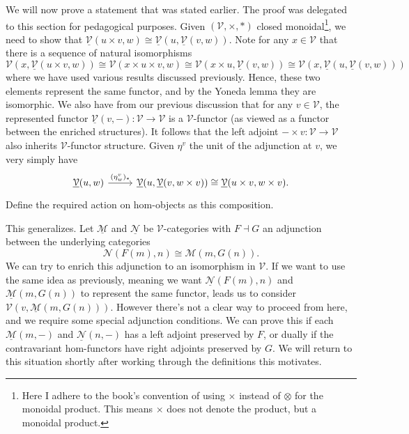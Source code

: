 We will now prove a statement that was stated earlier. The proof was delegated to this section for pedagogical purposes. Given $(\mathcal{V} ,\times ,*)$ closed monoidal\footnote{Here I adhere to the book's convention of using $\times $ instead of $\otimes $ for the monoidal product. This means $\times $ does not denote the product, but a monoidal product.}, we need to show that $\underline{\mathcal{V} } (u\times v,w)\cong \underline{\mathcal{V} } (u,\underline{\mathcal{V} } (v,w))$. Note for any $x\in \mathcal{V} $ that there is a sequence of natural isomorphisms
\[
	\mathcal{V} (x,\underline{\mathcal{V} } (u\times v,w))\cong \mathcal{V} (x\times u\times v,w)\cong\mathcal{V} (x\times u,\underline{\mathcal{V} } (v,w))\cong \mathcal{V} (x,\underline{\mathcal{V} } (u,\underline{\mathcal{V} } (v,w)))
\]
where we have used various results discussed previously. Hence, these two elements represent the same functor, and by the Yoneda lemma they are isomorphic. We also have from our previous discussion that for any $v\in \mathcal{V} $, the represented functor $\underline{\mathcal{V} } (v,-): \mathcal{V} \to \mathcal{V}  $ is a $\mathcal{V}$-functor (as viewed as a functor between the enriched structures). It follows that the left adjoint $-\times v : \mathcal{V}  \to \mathcal{V} $ also inherits $\mathcal{V} $-functor structure. Given $\eta^v$ the unit of the adjunction at $v$, we very simply have
\[\begin{tikzcd}[row sep = 2.5em, column sep = 2.5em]
	\underline{\mathcal{V} } (u,w)\ar[" (\eta_w^v)_* ", r]  & \underline{\mathcal{V} } (u,\underline{\mathcal{V} } (v,w\times v))\cong \underline{\mathcal{V} }(u\times v,w\times v).
\end{tikzcd}\]
Define the required action on hom-objects as this composition.

This generalizes. Let $\underline{\mathcal{M} } $ and $\underline{\mathcal{N} } $ be $\mathcal{V} $-categories with $F\dashv G$ an adjunction between the underlying categories
\[
	\mathcal{N} (F(m),n)\cong \mathcal{M} (m,G(n))
.\]
We can try to enrich this adjunction to an isomorphism in $\mathcal{V} $. If we want to use the same idea as previously, meaning we want $\underline{\mathcal{N} } (F(m),n)$ and $\underline{\mathcal{M} } (m,G(n))$ to represent the same functor, leads us to consider $\mathcal{V} (v,\underline{\mathcal{M} } (m,G(n)))$. However there's not a clear way to proceed from here, and we require some special adjunction conditions. We can prove this if each $\underline{\mathcal{M} } (m,-)$ and $\underline{\mathcal{N} } (n,-)$ has a left adjoint preserved by $F$, or dually if the contravariant hom-functors have right adjoints preserved by $G$. We will return to this situation shortly after working through the definitions this motivates.

